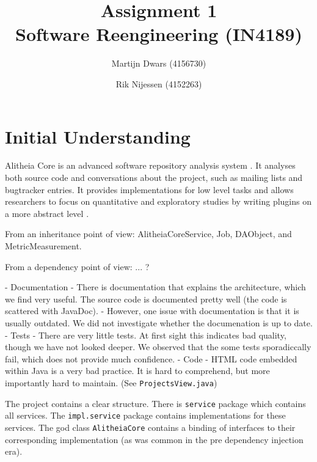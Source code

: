 \documentclass{article}
\author{Martijn Dwars (4156730) \and Rik Nijessen (4152263)}
\title{Assignment 1 \\ Software Reengineering (IN4189)}
\begin{document}
\maketitle

\section{Initial Understanding}
Alitheia Core is an advanced software repository analysis system \cite{sqooss-docs}. It analyses both source code and conversations about the project, such as mailing lists and bugtracker entries. It provides implementations for low level tasks and allows researchers to focus on quantitative and exploratory studies by writing plugins on a more abstract level \cite{sqooss-about}.

From an inheritance point of view: AlitheiaCoreService, Job, DAObject, and MetricMeasurement.


From a dependency point of view: ... ?



- Documentation
 - There is documentation that explains the architecture, which we find very useful. The source code is documented pretty well (the code is scattered with JavaDoc).
 - However, one issue with documentation is that it is usually outdated. We did not investigate whether the documenation is up to date.
- Tests
 - There are very little tests. At first sight this indicates bad quality, though we have not looked deeper. We observed that the some tests sporadiccally fail, which does not provide much confidence.
- Code
 - HTML code embedded within Java is a very bad practice. It is hard to comprehend, but more importantly hard to maintain. (See \verb|ProjectsView.java|)

The project contains a clear structure. There is \verb|service| package which contains all services. The \verb|impl.service| package contains implementations for these services. The god class \verb|AlitheiaCore| contains a binding of interfaces to their corresponding implementation (as was common in the pre dependency injection era).
\end{document}
